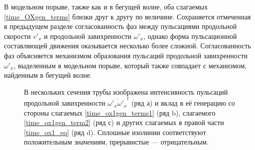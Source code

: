В модельном порыве, также как и в бегущей волне, оба слагаемых \eqref{time_OXgen_terms} близки друг к другу по величине. Сохраняется отмеченная в предыдущем разделе согласованность фаз между пульсациями продольной скорости $v'_x$ и продольной завихренности $\omega'_x$, однако форма пульсационной составляющей движения оказывается несколько более сложной. Согласованность фаз объясняется механизмом образования пульсаций продольной завихренности $\omega'_x$, выделенным в модельном порыве, который также совпадает с механизмом, найденным в бегущей волне. 

\begin{figure}[h!]
\caption{В нескольких сечения трубы изображена интенсивность пульсаций продольной завихренности $\overline{\omega'_x \omega'_x}^t$ (ряд а) и вклад в её генерацию со стороны слагаемых \eqref{time_ox1gen_terms1} (ряд b), слагаемого \eqref{time_ox1gen_term2} (ряд с) и других слагаемых в правой части \eqref{time_ox1_eq} (ряд d). Сплошные изолинии соответствуют положительным значениям, прерывистые --- отрицательным.}
\label{mp_ox1gen_pic}
\end{figure}

